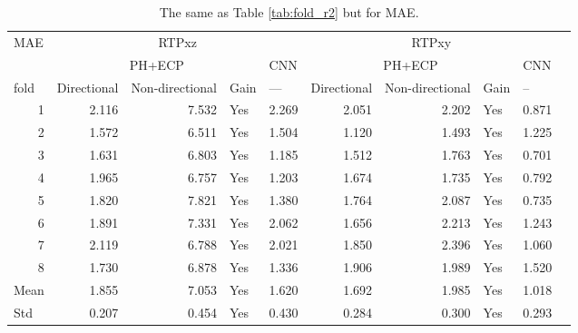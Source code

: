 \begin{table}[]
\caption{The same as Table \ref{tab:fold_r2} but for MAE.}
\label{tab:fold_mae}
\begin{tabular}{r|rrlr|rrlrr}
\hline
\multicolumn{1}{l|}{MAE} & \multicolumn{4}{c|}{RTPxz} & \multicolumn{4}{c}{RTPxy} & \multicolumn{1}{l}{} \\
\multicolumn{1}{l|}{} & \multicolumn{3}{c}{PH+ECP} & \multicolumn{1}{l|}{CNN} & \multicolumn{3}{c}{PH+ECP} & \multicolumn{1}{l}{CNN} & \multicolumn{1}{l}{} \\
\multicolumn{1}{l|}{fold} & \multicolumn{1}{l}{Directional} & \multicolumn{1}{l}{Non-directional} & Gain & \multicolumn{1}{l|}{---} & \multicolumn{1}{l}{Directional} & \multicolumn{1}{l}{Non-directional} & Gain & \multicolumn{1}{l}{--} &  \\ \hline
1 & 2.116 & 7.532 & Yes & 2.269 & 2.051 & 2.202 & Yes & 0.871 &  \\
2 & 1.572 & 6.511 & Yes & 1.504 & 1.120 & 1.493 & Yes & 1.225 &  \\
3 & 1.631 & 6.803 & Yes & 1.185 & 1.512 & 1.763 & Yes & 0.701 &  \\
4 & 1.965 & 6.757 & Yes & 1.203 & 1.674 & 1.735 & Yes & 0.792 &  \\
5 & 1.820 & 7.821 & Yes & 1.380 & 1.764 & 2.087 & Yes & 0.735 &  \\
6 & 1.891 & 7.331 & Yes & 2.062 & 1.656 & 2.213 & Yes & 1.243 &  \\
7 & 2.119 & 6.788 & Yes & 2.021 & 1.850 & 2.396 & Yes & 1.060 &  \\
8 & 1.730 & 6.878 & Yes & 1.336 & 1.906 & 1.989 & Yes & 1.520 &  \\ \hline
\multicolumn{1}{l|}{Mean} & 1.855 & 7.053 & Yes & 1.620 & 1.692 & 1.985 & Yes & 1.018 &  \\
\multicolumn{1}{l|}{Std} & 0.207 & 0.454 & Yes & 0.430 & 0.284 & 0.300 & Yes & 0.293 &  \\ \hline
\end{tabular}
\end{table}

% 
% 



